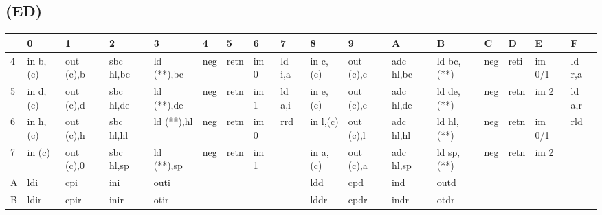 \subsection{ (ED)}
\label{OPCED}
\begin{ttfamily}
\begin{tiny}
\begin{tabularx}{1\textwidth}{l|X|X|X|X|X|X|X|X|X|X|X|X|X|X|X|X}
& 0 & 1 & 2 & 3 & 4 & 5 & 6 & 7 & 8 & 9 & A & B & C & D & E & F \\ \hline
4 & in b,(c) & out (c),b & sbc hl,bc & ld (**),bc & neg & retn & im 0 & ld i,a & in c,(c) & out (c),c & adc hl,bc & ld bc,(**) & neg & reti & im 0/1 & ld r,a \\ \hline
5 & in d,(c) & out (c),d & sbc hl,de & ld (**),de & neg & retn & im 1 & ld a,i & in e,(c) & out (c),e & adc hl,de & ld de,(**) & neg & retn & im 2 & ld a,r \\ \hline
6 & in h,(c) & out (c),h & sbc hl,hl & ld (**),hl & neg & retn & im 0 & rrd    & in l,(c) & out (c),l & adc hl,hl & ld hl,(**) & neg & retn & im 0/1 & rld \\ \hline
7 & in (c)   & out (c),0 & sbc hl,sp & ld (**),sp & neg & retn & im 1 &        & in a,(c) & out (c),a & adc hl,sp & ld sp,(**) & neg & retn & im 2 & \\ \hline
A & ldi      & cpi       & ini       & outi       &     &      &      &        & ldd      & cpd       & ind       & outd       &     &      &      & \\ \hline
B & ldir     & cpir      & inir      & otir       &     &      &      &        & lddr     & cpdr      & indr      & otdr       &     &      &      & \\ \hline
\end{tabularx}
\end{tiny}
\end{ttfamily}


